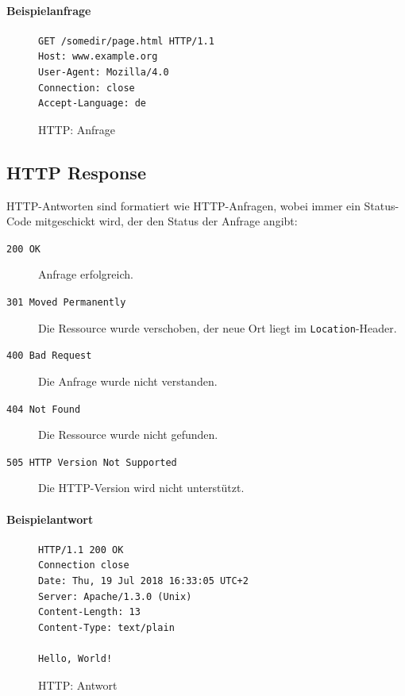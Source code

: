 \documentclass[a4paper, 11pt, accentcolor = tud3b]{tudreport}
\begin{document}
                \paragraph{Beispielanfrage}
	                \begin{figure}[H]
	                	\centering
	                	\begin{lstlisting}
GET /somedir/page.html HTTP/1.1
Host: www.example.org
User-Agent: Mozilla/4.0
Connection: close
Accept-Language: de
	                	\end{lstlisting}
	                	\caption{HTTP: Anfrage}
	                \end{figure}

            \subsection{HTTP Response}
                HTTP-Antworten sind formatiert wie HTTP-Anfragen, wobei immer ein Status-Code mitgeschickt wird, der den Status der Anfrage angibt:
                \begin{description}
                	\item[\texttt{200 OK}] Anfrage erfolgreich.
                	\item[\texttt{301 Moved Permanently}] Die Ressource wurde verschoben, der neue Ort liegt im \texttt{Location}-Header.
                	\item[\texttt{400 Bad Request}] Die Anfrage wurde nicht verstanden.
                	\item[\texttt{404 Not Found}] Die Ressource wurde nicht gefunden.
                	\item[\texttt{505 HTTP Version Not Supported}] Die HTTP-Version wird nicht unterstützt.
                \end{description}
                
                \paragraph{Beispielantwort}
	                \begin{figure}[H]
	                	\centering
	                	\begin{lstlisting}
HTTP/1.1 200 OK
Connection close
Date: Thu, 19 Jul 2018 16:33:05 UTC+2
Server: Apache/1.3.0 (Unix)
Content-Length: 13
Content-Type: text/plain

Hello, World!
	                	\end{lstlisting}
	                	\caption{HTTP: Antwort}
	                \end{figure}
\end{document}
